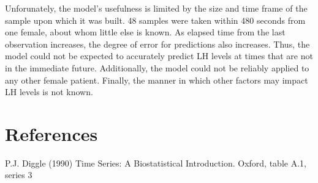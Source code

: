 \documentclass[]{article}
\begin{document}
Unforunately, the model's usefulness is limited by the size and time
frame of the sample upon which it was built. 48 samples were taken
within 480 seconds from one female, about whom little else is known. As
elapsed time from the last observation increases, the degree of error
for predictions also increases. Thus, the model could not be expected to
accurately predict LH levels at times that are not in the immediate
future. Additionally, the model could not be reliably applied to any
other female patient. Finally, the manner in which other factors may
impact LH levels is not known.

\section{References}\label{references}

P.J. Diggle (1990) Time Series: A Biostatistical Introduction. Oxford,
table A.1, series 3
\end{document}
